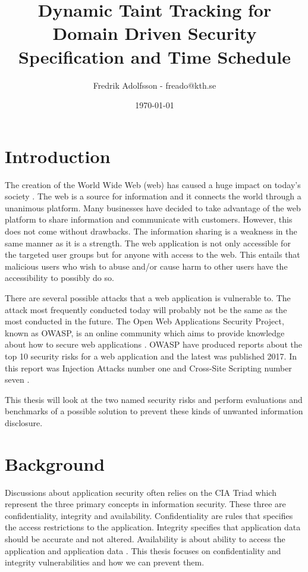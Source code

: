 \documentclass{../kththesis}
\title{Dynamic Taint Tracking for Domain Driven Security \\
					\large Specification and Time Schedule}
\author{Fredrik Adolfsson - freado@kth.se}
\date{\today}
\begin{document}
	
	\frontmatter
	
	
	
	\titlepage
	
	
	\tableofcontents
	
	
	\mainmatter
	
	
	
	\chapter{Introduction}
	The creation of the World Wide Web (web) has caused a huge impact on today’s society \parencite{www}. The web is a source for information and it connects the world through a unanimous platform. Many businesses have decided to take advantage of the web platform to share information and communicate with customers. However, this does not come without drawbacks. The information sharing is a weakness in the same manner as it is a strength. The web application is not only accessible for the targeted user groups but for anyone with access to the web. This entails that malicious users who wish to abuse and/or cause harm to other users have the accessibility to possibly do so. 
	
	There are several possible attacks that a web application is vulnerable to. The attack most frequently conducted today will probably not be the same as the most conducted in the future. The Open Web Applications Security Project, known as OWASP, is an online community which aims to provide knowledge about how to secure web applications \parencite{OpenWebApplicationSecurityProject}. OWASP have produced reports about the top 10 security risks for a web application and the latest was published 2017. In this report was Injection Attacks number one and Cross-Site Scripting number seven \parencite{OWASP2017, OpenWebApplicationSecurityProject, CrossMichael2007Dgtw}.
	
	This thesis will look at the two named security risks and perform evaluations and benchmarks of a possible solution to prevent these kinds of unwanted information disclosure. 
	
	
	
	\chapter{Background}
	Discussions about application security often relies on the CIA Triad which represent the three primary concepts in information security. These three are confidentiality, integrity and availability. Confidentiality are rules that specifies the access restrictions to the application. Integrity specifies that application data should be accurate and not altered. Availability is about ability to access the application and application data \parencite{2014C1-W}. This thesis focuses on confidentiality and integrity vulnerabilities and how we can prevent them.
	
\end{document}
